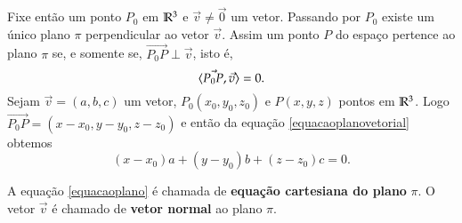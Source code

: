 Fixe ent\~ao um ponto $P_0$ em $\mathbb{R}^3$ e $\vec{v}\ne \vec{0}$ um vetor. Passando por $P_0$ existe um \'unico plano $\pi$ perpendicular ao vetor $\vec{v}$. Assim um ponto $P$ do espa\c{c}o pertence ao plano $\pi$ se, e somente se, $\vec{P_0P} \perp \vec{v}$, isto \'e,
\begin{equation}\label{equacaoplanovetorial}
    \langle \vec{P_0P}, \vec{v} \rangle = 0.
\end{equation}
Sejam $\vec{v} = (a,b,c)$ um vetor, $P_0(x_0, y_0, z_0)$ e $P(x, y, z)$ pontos em $\mathbb{R}^3$. Logo $\vec{P_0P} = (x - x_0, y - y_0, z - z_0)$ e ent\~ao da equa\c{c}\~ao \eqref{equacaoplanovetorial} obtemos
\begin{equation}\label{equacaoplano}
    (x - x_0)a + (y - y_0)b + (z - z_0)c = 0.
\end{equation}

A equa\c{c}\~ao \eqref{equacaoplano} \'e chamada de \textbf{equa\c{c}\~ao cartesiana do plano} $\pi$. O vetor $\vec{v}$ \'e chamado de \textbf{vetor normal} ao plano $\pi$.

